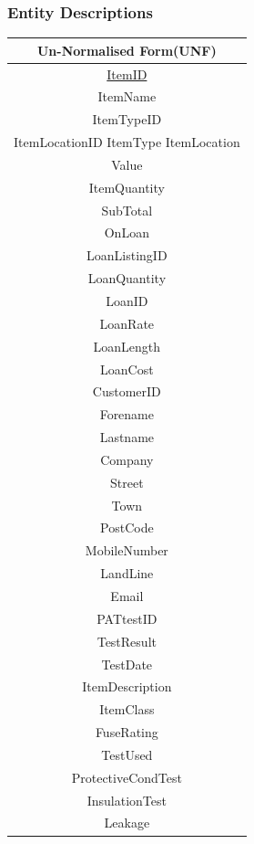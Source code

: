\subsubsection{Entity Descriptions}

\begin{center}
    \begin{tabular}{|c|}
        \hline
        \textbf{Un-Normalised Form(UNF)}\\ \hline
        \underline{ItemID}\\
        ItemName\\
        ItemTypeID\\
        ItemLocationID
        ItemType
        ItemLocation\\ 
        Value\\ 
        ItemQuantity\\ 
        SubTotal\\ 
        OnLoan\\ 
        LoanListingID\\ 
        LoanQuantity\\
        LoanID\\ 
        LoanRate\\ 
        LoanLength\\ 
        LoanCost\\ 
        CustomerID\\ 
        Forename\\ 
        Lastname\\ 
        Company\\ 
        Street\\ 
        Town\\ 
        PostCode\\ 
        MobileNumber\\ 
        LandLine\\ 
        Email\\ 
        PATtestID\\
        TestResult\\ 
        TestDate\\ 
        ItemDescription\\ 
        ItemClass\\ 
        FuseRating\\ 
        TestUsed\\ 
        ProtectiveCondTest\\ 
        InsulationTest\\ 
        Leakage\\ \hline
    \end{tabular}
\end{center}

